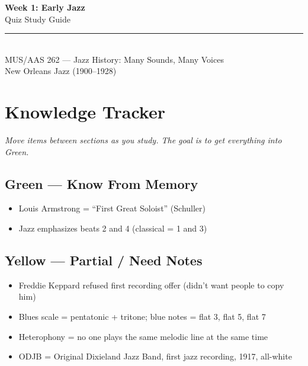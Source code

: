 \documentclass[11pt, letterpaper]{article}
\begin{document}
\thispagestyle{empty}
\begin{center}
    \vspace*{0.5cm}
    {\Huge\bfseries\color{accent} Week 1: Early Jazz}\\[0.5em]
    {\Large\color{subaccent} Quiz Study Guide}\\[1em]
    \textcolor{rulecolor}{\rule{0.6\textwidth}{0.8pt}}\\[0.8em]
    {\color{gray}\small MUS/AAS 262 --- Jazz History: Many Sounds, Many Voices\\[0.3em]
    New Orleans Jazz (1900--1928)}
    \vspace{1cm}
\end{center}

\tableofcontents
\newpage

\section{Knowledge Tracker}

\textit{Move items between sections as you study. The goal is to get everything into Green.}

\subsection*{\textcolor{greenzone}{Green --- Know From Memory}}
\begin{itemize}[label=$\square$]
    \item Louis Armstrong = ``First Great Soloist'' (Schuller)
    \item Jazz emphasizes beats 2 and 4 (classical = 1 and 3)
\end{itemize}

\subsection*{\textcolor{yellowzone}{Yellow --- Partial / Need Notes}}
\begin{itemize}[label=$\square$]
    \item Freddie Keppard refused first recording offer (didn't want people to copy him)
    \item Blues scale = pentatonic + tritone; blue notes = flat 3, flat 5, flat 7
    \item Heterophony = no one plays the same melodic line at the same time
    \item ODJB = Original Dixieland Jazz Band, first jazz recording, 1917, all-white
\end{itemize}
\end{document}
